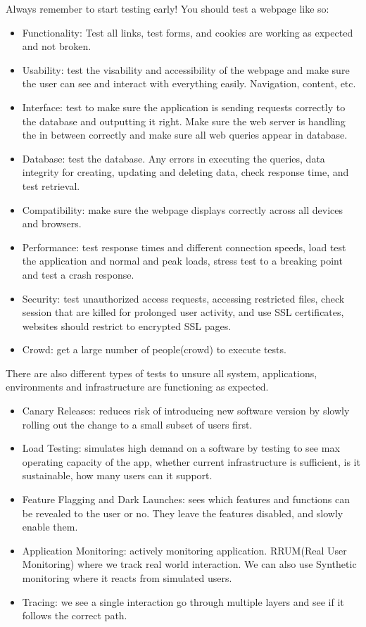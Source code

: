 \documentclass[11pt]{article}
\begin{document}
\noindent Always remember to start testing early! You should test a webpage like so:
\begin{itemize}
    \item Functionality: Test all links, test forms, and cookies are working as expected and not broken.
    \item Usability: test the visability and accessibility of the webpage and make sure the user can see and interact with everything easily. Navigation, content, etc.
    \item Interface: test to make sure the application is sending requests correctly to the database and outputting it right. Make sure the web server is handling the in between correctly and make sure all web queries appear in database.
    \item Database: test the database. Any errors in executing the queries, data integrity for creating, updating and deleting data, check response time, and test retrieval. 
    \item Compatibility: make sure the webpage displays correctly across all devices and browsers.
    \item Performance: test response times and different connection speeds, load test the application and normal and peak loads, stress test to a breaking point and test a crash response. 
    \item Security: test unauthorized access requests, accessing restricted files, check session that are killed for prolonged user activity, and use SSL certificates, websites should restrict to encrypted SSL pages.
    \item Crowd: get a large number of people(crowd) to execute tests. 
\end{itemize}

\noindent There are also different types of tests to unsure all system, applications, environments and infrastructure are functioning as expected.

\begin{itemize}
    \item Canary Releases: reduces risk of introducing new software version by slowly rolling out the change to a small subset of users first. 
    \item Load Testing: simulates high demand on a software by testing to see max operating capacity of the app, whether current infrastructure is sufficient, is it sustainable, how many users can it support.
    \item Feature Flagging and Dark Launches: sees which features and functions can be revealed to the user or no. They leave the features disabled, and slowly enable them.
    \item Application Monitoring: actively monitoring application. RRUM(Real User Monitoring) where we track real world interaction. We can also use Synthetic monitoring where it reacts from simulated users. 
    \item Tracing: we see a single interaction go through multiple layers and see if it follows the correct path. 
\end{itemize}
\end{document}
